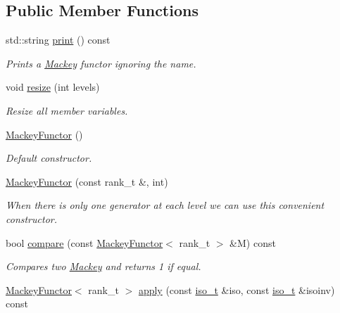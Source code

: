 \subsection*{Public Member Functions}
\begin{DoxyCompactItemize}
\item 
std\+::string \hyperlink{classMackey_1_1MackeyFunctor_a3f694cd4f0a234be4531c21771772b50}{print} () const
\begin{DoxyCompactList}\small\item\em Prints a \hyperlink{namespaceMackey}{Mackey} functor ignoring the name. \end{DoxyCompactList}\item 
void \hyperlink{classMackey_1_1MackeyFunctor_a44d3104a47f23de5d8141b7800db6d11}{resize} (int levels)
\begin{DoxyCompactList}\small\item\em Resize all member variables. \end{DoxyCompactList}\item 
\hyperlink{classMackey_1_1MackeyFunctor_a075cd364217700d5f5c2459d4a988a93}{Mackey\+Functor} ()
\begin{DoxyCompactList}\small\item\em Default constructor. \end{DoxyCompactList}\item 
\hyperlink{classMackey_1_1MackeyFunctor_a7cdc1be794a7b39e7d4b86c2ad26355e}{Mackey\+Functor} (const rank\+\_\+t \&, int)
\begin{DoxyCompactList}\small\item\em When there is only one generator at each level we can use this convenient constructor. \end{DoxyCompactList}\item 
bool \hyperlink{classMackey_1_1MackeyFunctor_a001f4a56e79e68ca3fef808e6b0ccca4}{compare} (const \hyperlink{classMackey_1_1MackeyFunctor}{Mackey\+Functor}$<$ rank\+\_\+t $>$ \&M) const
\begin{DoxyCompactList}\small\item\em Compares two \hyperlink{namespaceMackey}{Mackey} and returns 1 if equal. \end{DoxyCompactList}\item 
\hyperlink{classMackey_1_1MackeyFunctor}{Mackey\+Functor}$<$ rank\+\_\+t $>$ \hyperlink{classMackey_1_1MackeyFunctor_a24b7b8ce61be39ea51432d0d3737a55f}{apply} (const \hyperlink{classMackey_1_1MackeyFunctor_a53637e79f2502411ba085d2b2a61bb67}{iso\+\_\+t} \&iso, const \hyperlink{classMackey_1_1MackeyFunctor_a53637e79f2502411ba085d2b2a61bb67}{iso\+\_\+t} \&isoinv) const

\end{DoxyCompactItemize}
